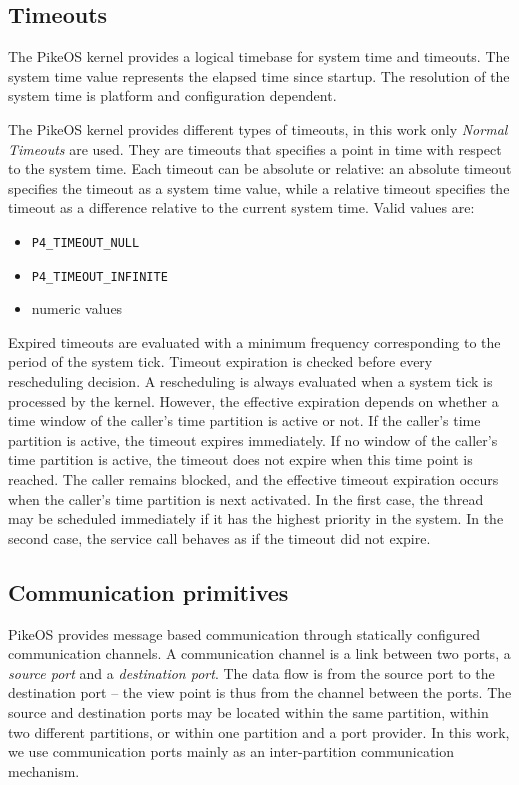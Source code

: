 \subsection{Timeouts}
The PikeOS kernel provides a logical timebase for system time and timeouts. The system time value represents the elapsed time since startup. The resolution of the system time is platform and configuration dependent.

\par The PikeOS kernel provides different types of timeouts, in this work only \emph{Normal Timeouts} are used. They are timeouts that specifies a point in time with respect to the system time. Each timeout can be absolute or relative: an absolute timeout specifies the timeout as a system time value, while a relative timeout specifies the timeout as a difference relative to the current system time. Valid values are:
\begin{itemize}
\item \verb|P4_TIMEOUT_NULL|
\item \verb|P4_TIMEOUT_INFINITE|
\item numeric values
\end{itemize}

Expired timeouts are evaluated with a minimum frequency corresponding to the period of the system tick. Timeout expiration is checked before every rescheduling decision. A rescheduling is always evaluated when a system tick is processed by the kernel. However, the effective expiration depends on whether a time window of the caller's time partition is active or not. If the caller’s time partition is active, the timeout expires immediately. If no window of the caller’s time partition is active, the timeout does not expire when this time point is reached. The caller remains blocked, and the effective timeout expiration occurs when the caller’s time partition is next activated. In the first case, the thread may be scheduled immediately if it has the highest priority in the system. In the second case, the service call behaves as if the timeout did not expire.

\subsection{Communication primitives}\label{sec:CommPorts}
PikeOS provides message based communication through statically configured communication channels. A communication channel is a link between two ports, a \emph{source port} and a \emph{destination port}. The data flow is from the source port to the destination port – the view point is thus from the channel between the ports. The source and destination ports may be located within the same partition, within two different partitions, or within one partition and a port provider. In this work, we use communication ports mainly as an inter-partition communication mechanism. 

